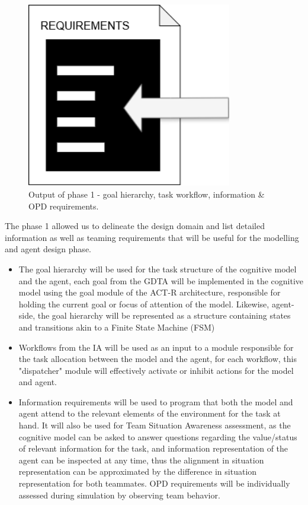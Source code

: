 \documentclass[12pt,a4paper]{article} %
\begin{document}
\begin{figure}[h!]
\begin{minipage}[b]{0.3\textwidth}
		\end{minipage}
		\begin{minipage}[b]{0.3\textwidth}
			\centering
			\includegraphics[width=0.8\textwidth]{images/requirements.png}
		\end{minipage}
		\caption{Output of phase 1 - goal hierarchy, task workflow, information \& OPD requirements.}
		\label{fig:logos}
	\end{figure}
	The phase 1 allowed us to delineate the design domain and list detailed information as well as teaming requirements that will be useful for the modelling and agent design phase.
	\begin{itemize}
		\item The goal hierarchy will be used for the task structure of the cognitive model and the agent, each goal from the GDTA will be implemented in the cognitive model using the goal module of the ACT-R architecture, responsible for holding the current goal or focus of attention of the model. Likewise, agent-side, the goal hierarchy will be represented as a structure containing states and transitions akin to a Finite State Machine (FSM)
		\item Workflows from the IA will be used as an input to a module responsible for the task allocation between the model and the agent, for each workflow, this "dispatcher" module will effectively activate or inhibit actions for the model and agent.
		\item Information requirements will be used to program that both the model and agent attend to the relevant elements of the environment for the task at hand. It will also be used for Team Situation Awareness assessment, as the cognitive model can be asked to answer questions regarding the value/status of relevant information for the task, and information representation of the agent can be inspected at any time, thus the alignment in situation representation can be approximated by the difference in situation representation for both teammates. OPD requirements will be individually assessed during simulation by observing team behavior.
	\end{itemize}
\end{document}
